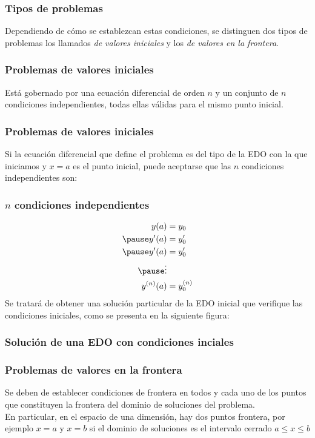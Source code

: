 \documentclass[12pt]{beamer}
\begin{document}
\begin{frame}
\frametitle{Tipos de problemas}
Dependiendo de cómo se establezcan estas condiciones, se distinguen dos tipos de problemas los llamados {\color{red}\textit{de valores iniciales}} y los {\color{ao}\textit{de valores en la frontera}}.
\end{frame}
\begin{frame}
\frametitle{Problemas de valores iniciales}
Está gobernado por una ecuación diferencial de orden $n$ y un conjunto de $n$ condiciones independientes, todas ellas válidas para el mismo punto inicial.
\end{frame}
\begin{frame}
\frametitle{Problemas de valores iniciales}
Si la ecuación diferencial que define el problema es del tipo de la EDO con la que iniciamos y $x = a$ es el punto inicial, puede aceptarse que las $n$ condiciones independientes son:
\end{frame}
\begin{frame}
\frametitle{$n$ condiciones independientes}
\begin{eqnarray*}
\begin{aligned}
y(a) & = y_{0} \\ \pause
\pderivada{y} (a) & = \pderivada{y}_{0} \\ \pause
\pderivada{y} (a) & = \pderivada{y}_{0} \\ \pause
\vdots \\
y^{(n)} (a) & = y^{(n)}_{0} 
\end{aligned}
\end{eqnarray*}
Se tratará de obtener una solución particular de la EDO inicial que verifique las condiciones iniciales, como se presenta en la siguiente figura:
\end{frame}
\begin{frame}[fragile]
\frametitle{Solución de una EDO con condiciones inciales}
\end{frame}
\begin{frame}
\frametitle{Problemas de valores en la frontera}
Se deben de establecer condiciones de frontera en todos y cada uno de los puntos que constituyen la frontera del dominio de soluciones del problema.
\\
\medskip
\pause
En particular, en el espacio de una dimensión, hay dos puntos frontera, por ejemplo $x = a$ y $x = b$ si el dominio de soluciones es el intervalo cerrado $a \leq x \leq b$
\end{frame}
\end{document}
